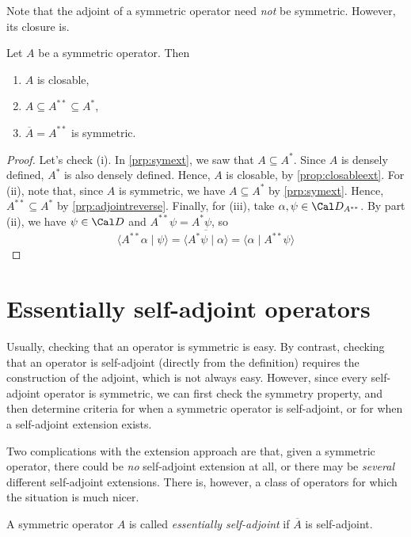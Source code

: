 Note that the adjoint of a symmetric operator need
\emph{not} be symmetric. However, its closure is.
\begin{proposition}
  Let \(A\) be a symmetric operator. Then
  \begin{enumerate}[label=(\roman*)]
    \item \(A\) is closable,
    \item \(A\subseteq A^{**}\subseteq A^*\),
    \item \(\overline A=A^{**}\) is symmetric.
  \end{enumerate}
\end{proposition}
\begin{proof}
  Let's check (i).
  In \cref{prp:symext}, we saw that $A\subseteq A^*$.
  Since \(A\) is densely defined, \(A^{*}\) is also densely defined. 
  Hence, \(A\) is closable, by \cref{prop:closableext}.
  For (ii), note that, since $A$ is symmetric, we have
  $A\subseteq A^*$ by \cref{prp:symext}.
  Hence, $A^{**}\subseteq A^*$ by \cref{prp:adjointreverse}.
  Finally, for (iii), take \(\alpha,\psi\in\Cal D_{A^{**}}\).
  By part (ii), we have \(\psi\in\Cal D\) and \(A^{**}\psi=A^*\psi\),
  so
  \begin{equation}
    \langle A^{**}\alpha\mid\psi\rangle
    = \overline{\langle A^*\psi\mid\alpha\rangle}
    = \langle \alpha\mid A^{**}\psi\rangle
  \end{equation}
\end{proof}

\section{Essentially self-adjoint operators}

Usually, checking that an operator is symmetric is easy. By contrast, checking that an operator is self-adjoint (directly from the definition) requires the construction of the adjoint, which is not always easy. However, since every self-adjoint operator is symmetric, we can first check the symmetry property, and then determine criteria for when a symmetric operator is self-adjoint, or for when a self-adjoint extension exists.

Two complications with the extension approach are that, given a symmetric operator, there could be \emph{no} self-adjoint extension at all, or there may be \emph{several} different self-adjoint extensions. There is, however, a class of operators for which the situation is much nicer.

\begin{definition}
A symmetric operator $A$ is called \emph{essentially
self-adjoint} if
$\overline{A}$ is self-adjoint.
\end{definition}

